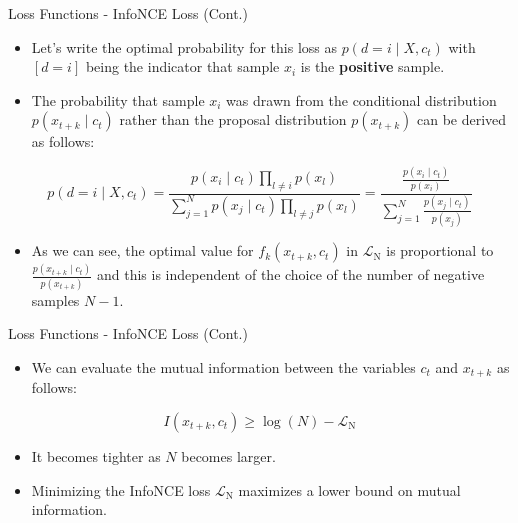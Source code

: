 \documentclass[serif, aspectratio=169]{beamer}
\begin{document}
\begin{frame}{Loss Functions - InfoNCE Loss (Cont.)}
     \begin{itemize}
         \item Let's write the optimal probability for this loss as $p\left(d=i \mid X, c_t\right)$ with $[d=i]$ being the indicator that sample $x_i$ is the \textbf{positive} sample.
         \item The probability that sample $x_i$ was drawn from the conditional distribution $p\left(x_{t+k} \mid c_t\right)$ rather than the proposal distribution $p\left(x_{t+k}\right)$ can be derived as follows:
     \end{itemize}

     \begin{equation*}
         p\left(d=i \mid X, c_t\right)=
         \frac{p\left(x_i \mid c_t\right) \prod_{l \neq i} p\left(x_l\right)}{\sum_{j=1}^N p\left(x_j \mid c_t\right) \prod_{l \neq j} p\left(x_l\right)}=
         \frac{\frac{p\left(x_i \mid c_t\right)}{p\left(x_i\right)}}{\sum_{j=1}^N \frac{p\left(x_j \mid c_t\right)}{p\left(x_j\right)}}
     \end{equation*}

     \begin{itemize}
         \item As we can see, the optimal value for $f_k\left(x_{t+k}, c_t\right)$ in $\mathcal{L}_{\mathrm{N}}$ is proportional to $\frac{p\left(x_{t+k} \mid c_t\right)}{p\left(x_{t+k}\right)}$ and this is independent of the choice of the number of negative samples $N - 1$.
     \end{itemize}
\end{frame}


\begin{frame}{Loss Functions - InfoNCE Loss (Cont.)}
     \begin{itemize}
         \item We can evaluate the mutual information between the variables $c_t$ and $x_{t+k}$ as follows:
     \end{itemize}

     \begin{equation*}
         I\left(x_{t+k}, c_t\right) \geq \log (N)-\mathcal{L}_{\mathrm{N}}
     \end{equation*}

     \begin{itemize}
         \item It becomes tighter as $N$ becomes larger.
         \item Minimizing the InfoNCE loss $\mathcal{L}_{\mathrm{N}}$ maximizes a lower bound on mutual information.
     \end{itemize}
\end{frame}
\end{document}
